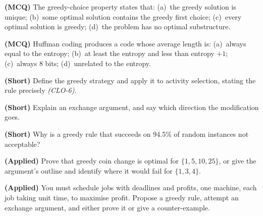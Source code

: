 \begin{reviewq}
  \item \textbf{(MCQ)} The greedy-choice property states that:
        (a)~the greedy solution is unique; (b)~some optimal solution contains
        the greedy first choice; (c)~every optimal solution is greedy;
        (d)~the problem has no optimal substructure.
  \item \textbf{(MCQ)} Huffman coding produces a code whose average length is:
        (a)~always equal to the entropy; (b)~at least the entropy and less than
        entropy $+1$; (c)~always 8 bits; (d)~unrelated to the entropy.
  \item \textbf{(Short)} Define the greedy strategy and apply it to activity
        selection, stating the rule precisely \emph{(CLO-6)}.
  \item \textbf{(Short)} Explain an exchange argument, and say which direction
        the modification goes.
  \item \textbf{(Short)} Why is a greedy rule that succeeds on 94.5\% of random
        instances not acceptable?
  \item \textbf{(Applied)} Prove that greedy coin change is optimal for
        $\{1,5,10,25\}$, or give the argument's outline and identify where it
        would fail for $\{1,3,4\}$.
  \item \textbf{(Applied)} You must schedule jobs with deadlines and profits,
        one machine, each job taking unit time, to maximise profit. Propose a
        greedy rule, attempt an exchange argument, and either prove it or give
        a counter-example.
\end{reviewq}
